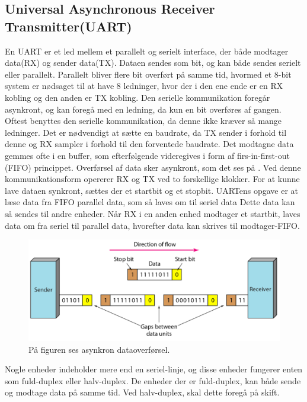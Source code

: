 \subsection{Universal Asynchronous Receiver Transmitter(UART)}
En UART er et led mellem et parallelt og serielt interface, der både modtager data(RX) og sender data(TX). Dataen sendes som bit, og kan både sendes serielt eller parallelt.\citep{Jimb02016a,Chun-zhiYin-shuiLun-yao2011}\newline 
Parallelt bliver flere bit overført på samme tid, hvormed et 8-bit system er nødsaget til at have 8 ledninger, hvor der i den ene ende er en RX kobling og den anden er TX kobling.\citep{Jimb02016a}\newline
Den serielle kommunikation foregår asynkront, og kan foregå med en ledning, da kun en bit overføres af gangen. Oftest benyttes den serielle kommunikation, da denne ikke kræver så mange ledninger.  Det er nødvendigt at sætte en baudrate, da TX sender i forhold til denne og RX sampler i forhold til den forventede baudrate. Det modtagne data gemmes ofte i en buffer, som efterfølgende videregives i form af firs-in-first-out (FIFO) princippet.\citep{Jimb02016a}\newline 
Overførsel af data sker asynkront, som det ses på . Ved denne kommunikationsform opererer RX og TX ved to forskellige klokker. For at kunne lave dataen synkront, sættes der et startbit og et stopbit. UARTens opgave er at læse data fra FIFO parallel data, som så laves om til seriel data Dette data kan så sendes til andre enheder. Når RX i en anden enhed modtager et startbit, laves data om fra seriel til parallel data, hvorefter data kan skrives til modtager-FIFO.\citep{Jimb02016a,Chun-zhiYin-shuiLun-yao2011}

\begin{figure}[H]
	\centering
	\includegraphics[scale=0.6]{figures/bProblemloesning/asynkron.png}
	\caption{På figuren ses asynkron dataoverførsel.\citep{Jimb02016}}
	\label{fig:asynkron}
\end{figure}

Nogle enheder indeholder mere end en seriel-linje, og disse enheder fungerer enten som fuld-duplex eller halv-duplex. De enheder der er fuld-duplex, kan både sende og modtage data på samme tid. Ved halv-duplex, skal dette foregå på skift.\citep{Jimb02016a,Chun-zhiYin-shuiLun-yao2011}
